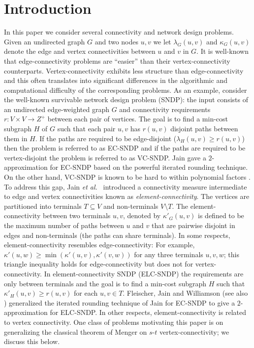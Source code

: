 \documentclass[11pt]{article}
\newcommand{\econn}{\lambda}
\newcommand{\vconn}{\kappa}
\newcommand{\elconn}{\kappa'}
\newcommand{\etal}{{\em et al.}\ }
\begin{document}
\section{Introduction}
In this paper we consider several connectivity and network design
problems. Given an undirected graph $G$ and two nodes $u,v$ we let
$\econn_G(u,v)$ and $\vconn_G(u,v)$ denote the edge and vertex
connectivities between $u$ and $v$ in $G$. It is well-known that
edge-connectivity problems are ``easier'' than their
vertex-connectivity counterparts. Vertex-connectivity exhibits less
structure than edge-connectivity and this often translates into
significant differences in the algorithmic and computational
difficulty of the corresponding problems. As an example, consider the
well-known survivable network design problem (SNDP): the input
consists of an undirected edge-weighted graph $G$ and connectivity
requirements $r:V \times V \rightarrow Z^+$ between each pair of
vertices.  The goal is to find a min-cost subgraph $H$ of $G$ such
that each pair $u,v$ has $r(u,v)$ disjoint paths between them in
$H$. If the paths are required to be edge-disjoint ($\econn_H(u,v) \ge
r(u,v)$) then the problem is referred to as EC-SNDP and if the paths
are required to be vertex-disjoint the problem is referred to as
VC-SNDP.  Jain \cite{Jain} gave a $2$-approximation for EC-SNDP based
on the powerful iterated rounding technique. On the other hand,
VC-SNDP is known to be hard to within polynomial factors
\cite{KortsarzKL,ChakCK08}.  To address this gap, Jain \etal
\cite{JainMVW99} introduced a connectivity measure intermediate to
edge and vertex connectivities known as {\em element-connectivity}.
The vertices are partitioned into terminals $T \subseteq V$ and
non-terminals $V \setminus T$. The element-connectivity between two
terminals $u,v$, denoted by $\elconn_G(u,v)$ is defined to be the
maximum number of paths between $u$ and $v$ that are pairwise disjoint
in edges and non-terminals (the paths can share terminals). In some
respects, element-connectivity resembles edge-connectivity: For
example, $\elconn(u,w) \ge \min(\elconn(u,v), \elconn(v,w))$ for any
three terminals $u,v,w$; this triangle inequality holds for
edge-connectivity but does not for vertex-connectivity. In
element-connectivity SNDP (ELC-SNDP) the requirements are only between
terminals and the goal is to find a min-cost subgraph $H$ such that
$\elconn_H(u,v) \ge r(u,v)$ for each $u,v \in T$. Fleischer, Jain and
Williamson \cite{FleischerJW} (see also \cite{CheriyanVV06})
generalized the iterated rounding technique of Jain for EC-SNDP to
give a $2$-approximation for ELC-SNDP.  In other respects,
element-connectivity is related to vertex connectivity. One class of
problems motivating this paper is on generalizing the classical
theorem of Menger on $s$-$t$ vertex-connectivity; we discuss this
below.
\end{document}
